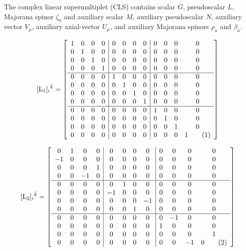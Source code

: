 \documentclass[12pt]{article}
\newcommand\numberthis{\addtocounter{equation}{1}\tag{\theequation}}
\begin{document}
The complex linear supermultiplet (CLS) contains scalar $G$, pseudoscalar $L$, Majorana spinor $\zeta_a$ and auxiliary scalar $M$, auxiliary pseudoscalar $N$, auxiliary vector $V_\mu$, auxiliary axial-vector $U_\mu$, and auxiliary Majorana spinors $\rho_a$ and $\beta_a$. \cite{38}

\[
[{\rm L_1}]_{i}{}^{\hat k}  = \left[\begin{array}{cccc|cccc|cccc}
    1 & 0 & 0 & 0 & 0 & 0 & 0 & 0 & 0 & 0 & 0 & 0 \\ 
    0 & 1 & 0 & 0 & 0 & 0 & 0 & 0 & 0 & 0 & 0 & 0 \\ 
    0 & 0 & 1 & 0 & 0 & 0 & 0 & 0 & 0 & 0 & 0 & 0 \\ 
    0 & 0 & 0 & 1 & 0 & 0 & 0 & 0 & 0 & 0 & 0 & 0 \\ 
    \hline
    0 & 0 & 0 & 0 & 1 & 0 & 0 & 0 & 0 & 0 & 0 & 0 \\ 
    0 & 0 & 0 & 0 & 0 & 1 & 0 & 0 & 0 & 0 & 0 & 0 \\ 
    0 & 0 & 0 & 0 & 0 & 0 & 1 & 0 & 0 & 0 & 0 & 0 \\ 
    0 & 0 & 0 & 0 & 0 & 0 & 0 & 1 & 0 & 0 & 0 & 0 \\ 
    \hline
    0 & 0 & 0 & 0 & 0 & 0 & 0 & 0 & 1 & 0 & 0 & 0 \\ 
    0 & 0 & 0 & 0 & 0 & 0 & 0 & 0 & 0 & 1 & 0 & 0 \\ 
    0 & 0 & 0 & 0 & 0 & 0 & 0 & 0 & 0 & 0 & 1 & 0 \\ 
    0 & 0 & 0 & 0 & 0 & 0 & 0 & 0 & 0 & 0 & 0 & 1
\numberthis\end{array}\right] \]

\[
[{\rm L_2}]_{i}{}^{\hat k}  = \left[\begin{array}{cccc|cccc|cccc}
    0 & 1 & 0 & 0 & 0 & 0 & 0 & 0 & 0 & 0 & 0 & 0 \\  
    -1 & 0 & 0 & 0 & 0 & 0 & 0 & 0 & 0 & 0 & 0 & 0 \\ 
    0 & 0 & 0 & 1 & 0 & 0 & 0 & 0 & 0 & 0 & 0 & 0 \\  
    0 & 0 & -1 & 0 & 0 & 0 & 0 & 0 & 0 & 0 & 0 & 0 \\
    \hline
    0 & 0 & 0 & 0 & 0 & 1 & 0 & 0 & 0 & 0 & 0 & 0 \\
    0 & 0 & 0 & 0 & -1 & 0 & 0 & 0 & 0 & 0 & 0 & 0 \\
    0 & 0 & 0 & 0 & 0 & 0 & 0 & -1 & 0 & 0 & 0 & 0 \\
    0 & 0 & 0 & 0 & 0 & 0 & 1 & 0 & 0 & 0 & 0 & 0 \\
    \hline
    0 & 0 & 0 & 0 & 0 & 0 & 0 & 0 & 0 & -1 & 0 & 0 \\
    0 & 0 & 0 & 0 & 0 & 0 & 0 & 0 & 1 & 0 & 0 & 0 \\
    0 & 0 & 0 & 0 & 0 & 0 & 0 & 0 & 0 & 0 & 0 & 1 \\
    0 & 0 & 0 & 0 & 0 & 0 & 0 & 0 & 0 & 0 & -1 & 0
\numberthis\end{array}\right] \]
\end{document}
